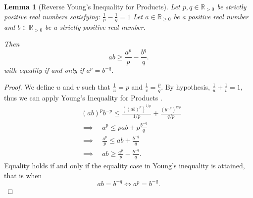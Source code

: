 \documentclass[10pt]{article} %
\newtheorem{lemma}{Lemma}[section]
\newcommand{\R}{\mathbb{R}}
\begin{document}
\begin{lemma}[Reverse Young's Inequality for Products]\label{lemma: reverse young}
Let $ p, q \in \R_{>0} $ be strictly positive real numbers satisfying:
$ \frac{1}{p} - \frac{1}{q} = 1 $
Let $ a \in \mathbb{R}_{\geq 0} $ be a positive real number and  $ b \in \R_{>0} $ be a strictly positive real number.  

Then
\begin{equation}
ab \geq \frac{a^p}{p} - \frac{b^q}{q}.
\end{equation}
with equality if and only if $a^p = b^{-q}$.
\end{lemma}
\begin{proof}
We define $u$ and $v$ such that $\frac{1}{u} = p $ and $\frac{1}{v} = \frac{p}{q}$. By hypothesis, $\frac{1}{u} + \frac{1}{v} = 1$, thus we can apply Young's Inequality for Products \citep{rudin2021principles}.
\begin{align}
& (ab)^p b^{-p} \leq \frac{((ab)^p)^{1/p}}{1/p} + \frac{(b^{-p})^{q/p}}{q/p} \\
        &\implies \quad a^p \leq pab + p\frac{b^{-q}}{q} \\
        &\implies \quad \frac{a^p}{p} \leq ab + \frac{b^{-q}}{q} \\
        &\implies \quad ab \geq \frac{a^p}{p} - \frac{b^{-q}}{q}.
\end{align}
Equality holds if and only if the equality case in Young's inequality is attained, that is when
\begin{equation}
ab = b^{-q} \Longleftrightarrow a^p = b^{-q}. 
\end{equation}
\end{proof}
\end{document}
